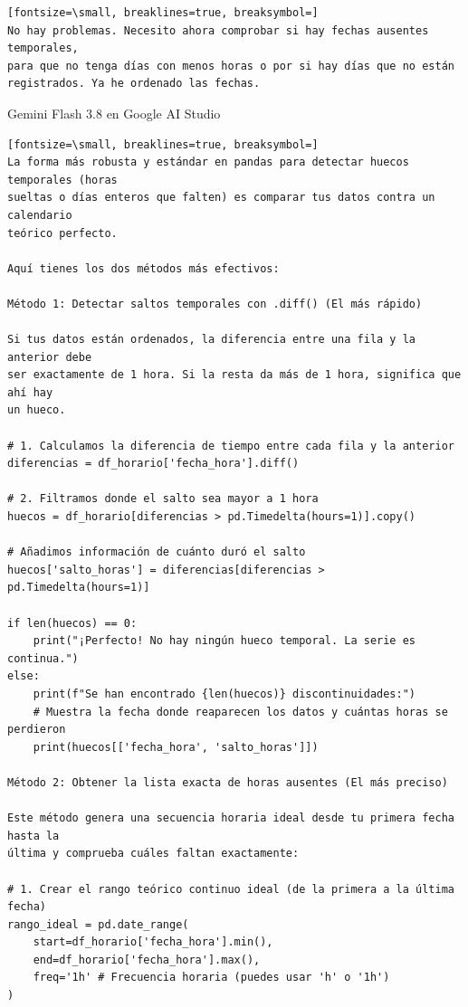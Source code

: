 \documentclass[12pt,a4paper,oneside]{book}
\begin{document}
\begin{iaprompt}
\begin{Verbatim}[fontsize=\small, breaklines=true, breaksymbol=]
No hay problemas. Necesito ahora comprobar si hay fechas ausentes temporales,
para que no tenga días con menos horas o por si hay días que no están
registrados. Ya he ordenado las fechas.
\end{Verbatim}
\end{iaprompt}
\begin{iaresp}{Gemini Flash 3.8 en Google AI Studio}
\begin{Verbatim}[fontsize=\small, breaklines=true, breaksymbol=]
La forma más robusta y estándar en pandas para detectar huecos temporales (horas
sueltas o días enteros que falten) es comparar tus datos contra un calendario
teórico perfecto.

Aquí tienes los dos métodos más efectivos:

Método 1: Detectar saltos temporales con .diff() (El más rápido)

Si tus datos están ordenados, la diferencia entre una fila y la anterior debe
ser exactamente de 1 hora. Si la resta da más de 1 hora, significa que ahí hay
un hueco.

# 1. Calculamos la diferencia de tiempo entre cada fila y la anterior
diferencias = df_horario['fecha_hora'].diff()

# 2. Filtramos donde el salto sea mayor a 1 hora
huecos = df_horario[diferencias > pd.Timedelta(hours=1)].copy()

# Añadimos información de cuánto duró el salto
huecos['salto_horas'] = diferencias[diferencias > pd.Timedelta(hours=1)]

if len(huecos) == 0:
    print("¡Perfecto! No hay ningún hueco temporal. La serie es continua.")
else:
    print(f"Se han encontrado {len(huecos)} discontinuidades:")
    # Muestra la fecha donde reaparecen los datos y cuántas horas se perdieron
    print(huecos[['fecha_hora', 'salto_horas']])

Método 2: Obtener la lista exacta de horas ausentes (El más preciso)

Este método genera una secuencia horaria ideal desde tu primera fecha hasta la
última y comprueba cuáles faltan exactamente:

# 1. Crear el rango teórico continuo ideal (de la primera a la última fecha)
rango_ideal = pd.date_range(
    start=df_horario['fecha_hora'].min(),
    end=df_horario['fecha_hora'].max(),
    freq='1h' # Frecuencia horaria (puedes usar 'h' o '1h')
)


\end{Verbatim}
\end{iaresp}
\end{document}
